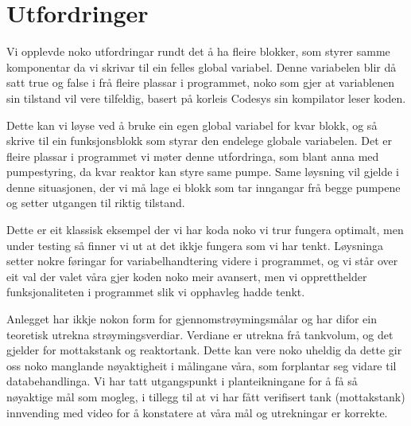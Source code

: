 \section{Utfordringer}
\thispagestyle{fancy}

Vi opplevde noko utfordringar rundt det å ha fleire blokker, som styrer samme komponentar da vi skrivar til ein felles global variabel.
Denne variabelen blir då satt true og false i frå fleire plassar i programmet, noko som gjer at variablenen sin tilstand vil vere tilfeldig, basert på korleis Codesys sin kompilator leser koden.

Dette kan vi løyse ved å bruke ein egen global variabel for kvar blokk, og så skrive til ein funksjonsblokk som styrar den endelege globale variabelen.
Det er fleire plassar i programmet vi møter denne utfordringa, som blant anna med pumpestyring, da kvar reaktor kan styre same pumpe.
Same løysning vil gjelde i denne situasjonen, der vi må lage ei blokk som tar inngangar frå begge pumpene og setter utgangen til riktig tilstand.  

Dette er eit klassisk eksempel der vi har koda noko vi trur fungera optimalt, men under testing så finner vi ut at det ikkje fungera som vi har tenkt.
Løysninga setter nokre føringar for variabelhandtering videre i programmet, og vi står over eit val der valet våra gjer koden noko meir avansert, men vi oppretthelder funksjonaliteten i programmet slik vi opphavleg hadde tenkt.

Anlegget har ikkje nokon form for gjennomstrøymingsmålar og har difor ein teoretisk utrekna strøymingsverdiar. 
Verdiane er utrekna frå tankvolum, og det gjelder for mottakstank og reaktortank. 
Dette kan vere noko uheldig da dette gir oss noko manglande nøyaktigheit i målingane våra, som forplantar seg vidare til databehandlinga.
Vi har tatt utgangspunkt i planteikningane for å få så nøyaktige mål som mogleg, i tillegg til at vi har fått verifisert tank (mottakstank) innvending med video for å konstatere at våra mål og utrekningar er korrekte.


